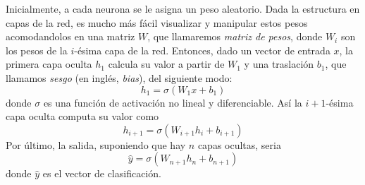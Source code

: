 Inicialmente, a cada neurona se le asigna un peso aleatorio. Dada la
estructura en capas de la red, es mucho más fácil visualizar y
manipular estos pesos acomodandolos en una matriz $W$, que llamaremos
\textit{matriz de pesos}, donde $W_i$ son los pesos de la $i$-ésima
capa de la red. Entonces, dado un vector de entrada $x$, la primera
capa oculta $h_1$ calcula su valor a partir de $W_1$ y una traslación
$b_1$, que llamamos \textit{sesgo} (en inglés, \textit{bias}), del
siguiente modo:
\begin{equation}
  h_1 = \sigma(W_1x + b_1)
\end{equation}
donde $\sigma$ es una función de activación no lineal y
diferenciable. Así la $i+1$-ésima capa oculta computa su valor como
\begin{equation}
  h_{i+1} = \sigma(W_{i+1}h_i + b_{i+1})
\end{equation}
Por último, la salida, suponiendo que hay $n$ capas ocultas, seria
\begin{equation}
  \hat{y} = \sigma{(W_{n+1}h_n + b_{n+1})}
\end{equation}
donde $\hat{y}$ es el vector de clasificación.
